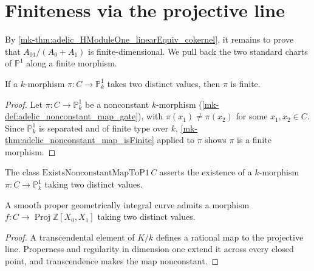 \section{Finiteness via the projective line}
\label{mk-sec:RiemannRoch_Adelic_finiteness}

By \ref{mk-thm:adelic_HModuleOne_linearEquiv_cokernel}, it remains to prove
that \(A_{01}/(A_0+A_1)\) is finite-dimensional.  We pull back the two
standard charts of \(\mathbb P^1\) along a finite morphism.

\begin{proposition}
  \label{mk-thm:adelic_exists_finiteMorphismToP1}
  \leanok
  If a \(k\)-morphism \(\pi\colon C\to\mathbb P^1_k\) takes two distinct
  values, then \(\pi\) is finite.
\end{proposition}
\begin{proof}
  \leanok
  Let \(\pi \colon C \to \mathbb{P}^1_k\) be a nonconstant \(k\)-morphism
  (\ref{mk-def:adelic_nonconstant_map_gate}), with \(\pi(x_1) \ne
  \pi(x_2)\) for some \(x_1, x_2 \in C\). Since \(\mathbb{P}^1_k\) is
  separated and of finite type over \(k\), \ref{mk-thm:adelic_nonconstant_map_isFinite}
  applied to \(\pi\) shows \(\pi\) is a finite morphism.
\end{proof}

\begin{definition}
  \label{mk-def:adelic_nonconstant_map_gate}
  \leanok

  The class \(\mathrm{ExistsNonconstantMapToP1}\, C\) asserts the
  existence of a \(k\)-morphism \(\pi \colon C \to \mathbb{P}^1_k\)
  taking two distinct values.
\end{definition}

\begin{proposition}
  \label{mk-thm:adelic_exists_nonconstant_projint}
  \leanok

  A smooth proper geometrically integral curve admits a morphism
  \(f\colon C\to\operatorname{Proj}\mathbb Z[X_0,X_1]\) taking two
  distinct values.
\end{proposition}
\begin{proof}
  \leanok
  A transcendental element of \(K/k\) defines a rational map to the
  projective line.  Properness and regularity in dimension one extend it
  across every closed point, and transcendence makes the map nonconstant.
\end{proof}


